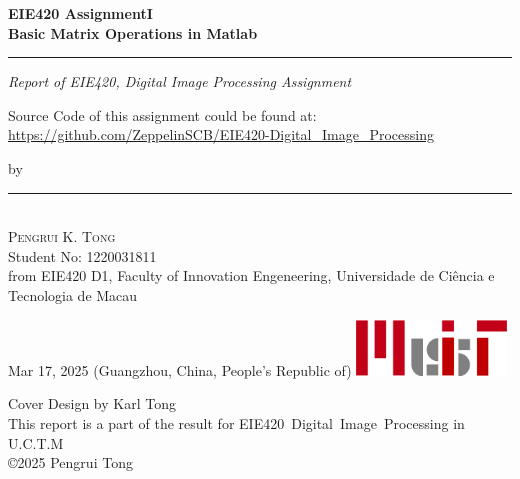 \begin{titlepage}
    \ActivateWarningFilters[latex]

    \parbox{1\textwidth}{ %
		{\Huge\bfseries EIE420 AssignmentI \\[0.15\baselineskip] 
        Basic Matrix Operations in Matlab}\\[0.15\baselineskip] %
		\rule{1\textwidth}{1pt} %
        {\Large\textit{Report of EIE420, Digital Image Processing Assignment}}
        \newline
    }
    \parbox{1\textwidth}{
        \vspace{1\baselineskip}
        \large
        Source Code of this assignment could be found at:\newline
        \url{https://github.com/ZeppelinSCB/EIE420-Digital_Image_Processing}
        \newline
    }
    \vspace{100pt} %
    \parbox{1\textwidth}{
        {\large by}\\[1.5\baselineskip]
        {\rule[1pt]{200pt}{1pt}} \\[1.25pt]
        {\huge\textsc{Pengrui K. Tong}
            }\\
        {\large{Student No: 1220031811}} \\
        \large from EIE420 D1, \newline
        Faculty of Innovation Engeneering, \newline
        Universidade de Ciência e Tecnologia de Macau
    }
		

    \vspace*{\fill}
		Mar 17, 2025 \newline 
        (Guangzhou, China, People's Republic of)
        \vspace{0.7\baselineskip}\newline
        \includegraphics[width = 40mm]{../Header/MUIT_origin.png}\par
        {\small Cover Design by Karl Tong}\\[0.25pt]
        {\small This report is a part of the result for}
        {\small EIE420~Digital~Image~Processing in U.C.T.M}\\[0.25pt]
        {\small \copyright 2025 Pengrui Tong}
\end{titlepage}
